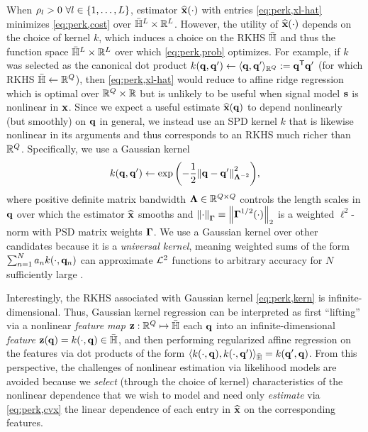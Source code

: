 When $\rho_l>0\,\, \forall l \in \set{1,\dots,L}$, 
estimator $\bmxha{\cdot}$
with entries \eqref{eq:perk,xl-hat} minimizes \eqref{eq:perk,cost}
over ${\bar{\mathbb{H}}}^L \times \mathbb{R}^L$.
However, the utility of $\bmxha{\cdot}$
depends on the choice of kernel $k$,
which induces a choice on the RKHS ${\bar{\mathbb{H}}}$
and thus the function space ${\bar{\mathbb{H}}}^L \times \mathbb{R}^L$
over which \eqref{eq:perk,prob} optimizes.
For example, if $k$ was selected as the canonical dot product 
$k(\mathbf{q},\mathbf{q}') \gets \langle \mathbf{q},\mathbf{q}' \rangle_{\mathbb{R}^{Q}} := \mathbf{q}^{\mathsf{T}} \mathbf{q}'$
(for which RKHS ${\bar{\mathbb{H}}} \gets \mathbb{R}^{Q}$),
then \eqref{eq:perk,xl-hat} would reduce 
to affine ridge regression \cite{hoerl:70:rrb}
which is optimal over $\mathbb{R}^{Q} \times \mathbb{R}$
but is unlikely to be useful 
when signal model $\mathbf{s}$ is nonlinear in $\mathbf{x}$.
Since we expect a useful estimate $\est{\bmx}\paren{\bmq}$ 
to depend nonlinearly (but smoothly) 
on $\mathbf{q}$ in general, 
we instead use 
an SPD kernel $k$ 
that is likewise nonlinear in its arguments
and thus corresponds to an RKHS much richer than $\mathbb{R}^{Q}$. 
Specifically, we use a Gaussian kernel
\begin{align}
	k(\bmq,\bmq') \gets \expa{-\frac{1}{2}{\norm{\bmq-\bmq'}^2_{\bmL^{-2}}}},
	\label{eq:perk,kern}
\end{align}
where positive definite matrix bandwidth $\boldsymbol{\Lambda} \in \mathbb{R}^{Q \times Q}$ 
controls the length scales in $\mathbf{q}$ over which 
the estimator $\widehat{\mathbf{x}}$ smooths
and $\norm{\cdot}_{\bmG} \equiv \norm{\bmG^{1/2}\paren{\cdot}}_2$
is a weighted $\ell^2$-norm
with PSD matrix weights $\boldsymbol{\Gamma}$.
We use a Gaussian kernel
over other candidates
because it is a \emph{universal kernel},
meaning weighted sums of the form 
$\sum_{n=1}^N a_n k\paren{\cdot,\bmq_n}$
can approximate $\mathcal{L}^2$ functions
to arbitrary accuracy
for $N$ sufficiently large
\cite{steinwart:08:svm}.

Interestingly, 
the RKHS associated 
with Gaussian kernel \eqref{eq:perk,kern}
is infinite-dimensional.
Thus, 
Gaussian kernel regression
can be interpreted as 
first ``lifting'' 
via a nonlinear \emph{feature map} 
$\mathbf{z} : \mathbb{R}^{Q} \mapsto {\bar{\mathbb{H}}}$ 
each $\mathbf{q}$ 
into an infinite-dimensional \emph{feature} 
$\bmza{\bmq} = k\paren{\cdot,\bmq} \in \rkhs$,
and then performing regularized affine regression
on the features
via dot products of the form
$\innprod{k\paren{\cdot,\bmq}}{k\paren{\cdot,\bmq'}}_{\rkhs}
	= k\paren{\bmq',\bmq}$.
From this perspective,
the challenges of nonlinear estimation 
via likelihood models
are avoided 
because we \emph{select} 
(through the choice of kernel) 
characteristics of the nonlinear dependence
that we wish to model
and need only \emph{estimate} via \eqref{eq:perk,cvx} 
the linear dependence
of each entry in $\widehat{\mathbf{x}}$ 
on the corresponding features.

